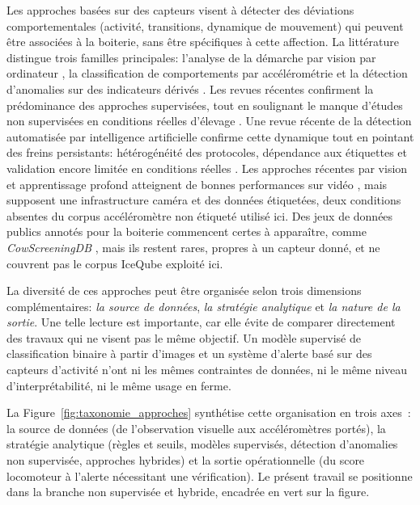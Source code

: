 Les approches basées sur des capteurs visent à détecter des déviations comportementales
(activité, transitions, dynamique de mouvement) qui peuvent être associées à la boiterie,
sans être spécifiques à cette affection.
La littérature distingue trois familles principales: l'analyse de la démarche par vision
par ordinateur \citep{vanhertem2014evaluation,lavrova2023lameness}, la classification de
comportements par accélérométrie \citep{oleary2020accelerometers,alsaaod2019automatic,
balasso2023behaviour,benaissa2019calving} et la détection d'anomalies sur des indicateurs dérivés
\citep{qiao2021review,chandola2009anomaly}. Les revues
récentes confirment la prédominance des approches supervisées, tout en soulignant le
manque d'études non supervisées en conditions réelles d'élevage
\citep{qiao2021review,oleary2020accelerometers}. Une revue récente de la détection
automatisée par intelligence artificielle confirme cette dynamique tout en pointant des
freins persistants: hétérogénéité des protocoles, dépendance aux étiquettes et validation
encore limitée en conditions réelles \citep{siachos2024automated}. Les approches récentes par
vision et apprentissage profond atteignent de bonnes performances sur vidéo
\citep{myint2024lameness}, mais supposent une infrastructure caméra et des données étiquetées,
deux conditions absentes du corpus accéléromètre non étiqueté utilisé ici. Des jeux de données
publics annotés pour la boiterie commencent certes à apparaître, comme \textit{CowScreeningDB}
\citep{ismail2024cowscreeningdb}, mais ils restent rares, propres à un capteur donné, et ne
couvrent pas le corpus IceQube exploité ici.

La diversité de ces approches peut être organisée selon trois dimensions complémentaires:
\textit{la source de données}, \textit{la stratégie analytique} et \textit{la nature de la
sortie}. Une telle lecture est importante, car elle évite de comparer directement des travaux
qui ne visent pas le même objectif. Un modèle supervisé de classification binaire à partir
d'images et un système d'alerte basé sur des capteurs d'activité n'ont ni les mêmes
contraintes de données, ni le même niveau d'interprétabilité, ni le même usage en ferme.

La Figure~\ref{fig:taxonomie_approches} synthétise cette organisation en trois axes~: la
source de données (de l'observation visuelle aux accéléromètres portés), la stratégie
analytique (règles et seuils, modèles supervisés, détection d'anomalies non supervisée,
approches hybrides) et la sortie opérationnelle (du score locomoteur à l'alerte
nécessitant une vérification). Le présent travail se positionne dans la branche non supervisée et hybride,
encadrée en vert sur la figure.

